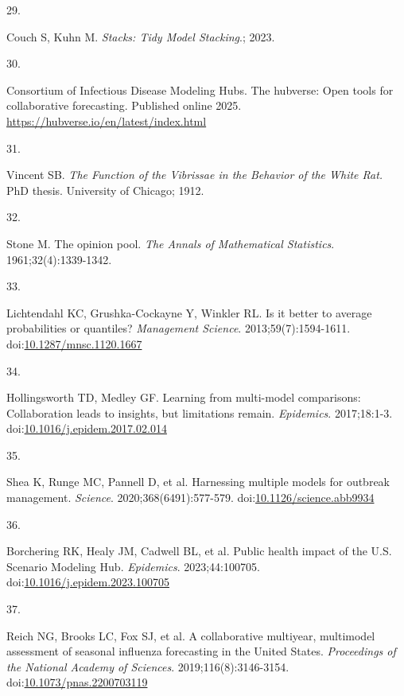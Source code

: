 \documentclass[
  letterpaper,
  DIV=11,
  numbers=noendperiod]{scrartcl}
\newlength{\cslhangindent}
\newlength{\csllabelwidth}
\newenvironment{CSLReferences}[2] %
 {\begin{list}{}{%
  \setlength{\itemindent}{0pt}
  \setlength{\leftmargin}{0pt}
  \setlength{\parsep}{0pt}
  \ifodd #1
   \setlength{\leftmargin}{\cslhangindent}
   \setlength{\itemindent}{-1\cslhangindent}
  \fi
  \setlength{\itemsep}{#2\baselineskip}}}
 {\end{list}}
\newcommand{\CSLLeftMargin}[1]{\parbox[t]{\csllabelwidth}{\strut#1\strut}}
\newcommand{\CSLRightInline}[1]{\parbox[t]{\linewidth - \csllabelwidth}{\strut#1\strut}}
\begin{document}
\begin{CSLReferences}{0}{1}
\CSLLeftMargin{29. }%
\CSLRightInline{Couch S, Kuhn M. \emph{Stacks: Tidy Model Stacking}.;
2023.}

\CSLLeftMargin{30. }%
\CSLRightInline{Consortium of Infectious Disease Modeling Hubs. The
hubverse: Open tools for collaborative forecasting. Published online
2025. \url{https://hubverse.io/en/latest/index.html}}

\CSLLeftMargin{31. }%
\CSLRightInline{Vincent SB. \emph{The Function of the Vibrissae in the
Behavior of the White Rat.} PhD thesis. University of Chicago; 1912.}

\CSLLeftMargin{32. }%
\CSLRightInline{Stone M. The opinion pool. \emph{The Annals of
Mathematical Statistics}. 1961;32(4):1339-1342.}

\CSLLeftMargin{33. }%
\CSLRightInline{Lichtendahl KC, Grushka-Cockayne Y, Winkler RL. Is it
better to average probabilities or quantiles? \emph{Management Science}.
2013;59(7):1594-1611.
doi:\href{https://doi.org/10.1287/mnsc.1120.1667}{10.1287/mnsc.1120.1667}}

\CSLLeftMargin{34. }%
\CSLRightInline{Hollingsworth TD, Medley GF. Learning from multi-model
comparisons: {Collaboration} leads to insights, but limitations remain.
\emph{Epidemics}. 2017;18:1-3.
doi:\href{https://doi.org/10.1016/j.epidem.2017.02.014}{10.1016/j.epidem.2017.02.014}}

\CSLLeftMargin{35. }%
\CSLRightInline{Shea K, Runge MC, Pannell D, et al. Harnessing multiple
models for outbreak management. \emph{Science}. 2020;368(6491):577-579.
doi:\href{https://doi.org/10.1126/science.abb9934}{10.1126/science.abb9934}}

\CSLLeftMargin{36. }%
\CSLRightInline{Borchering RK, Healy JM, Cadwell BL, et al. Public
health impact of the {U}.{S}. {Scenario} {Modeling} {Hub}.
\emph{Epidemics}. 2023;44:100705.
doi:\href{https://doi.org/10.1016/j.epidem.2023.100705}{10.1016/j.epidem.2023.100705}}

\CSLLeftMargin{37. }%
\CSLRightInline{Reich NG, Brooks LC, Fox SJ, et al. A collaborative
multiyear, multimodel assessment of seasonal influenza forecasting in
the {United} {States}. \emph{Proceedings of the National Academy of
Sciences}. 2019;116(8):3146-3154.
doi:\href{https://doi.org/10.1073/pnas.2200703119}{10.1073/pnas.2200703119}}


\end{CSLReferences}
\end{document}
